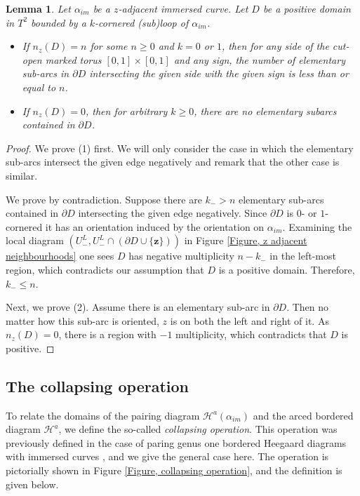 \documentclass{amsart}
\newtheorem{lem}[thm]{Lemma}
\theoremstyle{definition}
\theoremstyle{remark}
\numberwithin{equation}{section}
\numberwithin{equation}{section} \makeatletter
\begin{document}
\begin{lem}\label{Lemma, constraints on positive domains bounded by one-cornered subloop}
Let $\alpha_{im}$ be a $z$-adjacent immersed curve. Let $D$ be a positive domain in ${T}^2$ bounded by a $k$-cornered (sub)loop of $\alpha_{im}$.
\begin{itemize}
	\item[(1)]If $n_z(D)=n$ for some $n\geq 0$ and $k=0$ or $1$, then for any side of the cut-open marked torus $[0,1]\times [0,1]$ and any sign, the number of elementary sub-arcs in $\partial D$ intersecting the given side with the given sign is less than or equal to $n$.
	\item[(2)]If $n_z(D)=0$, then for arbitrary $k\geq 0$, there are no elementary subarcs contained in $\partial D$. 
\end{itemize}
\end{lem}
\begin{proof}
We prove (1) first. We will only consider the case in which the elementary sub-arcs intersect the given edge negatively and remark that the other case is similar. 

We prove by contradiction. Suppose there are $k_->n$ elementary sub-arcs contained in $\partial D$ intersecting the given edge negatively. Since $\partial D$ is $0$- or $1$-cornered it has an orientation induced by the orientation on $\alpha_{im}$. Examining the local diagram $(U_-^L, U_-^L\cap({\partial D}\cup \{\bm{z}\}))$ in Figure \ref{Figure, z adjacent neighbourhoods} one sees $D$ has negative multiplicity $n-k_-$ in the left-most region, which contradicts our assumption that $D$ is a positive domain. Therefore, $k_-\leq n$. 

Next, we prove (2). Assume there is an elementary sub-arc in $\partial D$. Then no matter how this sub-arc is oriented, $z$ is on both the left and right of it. As $n_z(D)=0$, there is a region with $-1$ multiplicity, which contradicts that $D$ is positive. 
\end{proof}
\subsection{The collapsing operation}
To relate the domains of the pairing diagram $\mathcal{H}^a(\alpha_{im})$ and the arced bordered diagram $\mathcal{H}^a$, we define the so-called \emph{collapsing operation}. This operation was previously defined in the case of paring genus one bordered Heegaard diagrams with immersed curves \cite{Chen2019}, and we give the general case here. The operation is pictorially shown in Figure \ref{Figure, collapsing operation}, and the definition is given below.
\end{document}
